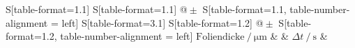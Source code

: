 \begin{table}
    \centering
    \caption{Messung der Counts für zwei verschiedene Foliendicken des gleichen Materials}
    \label{tab:divers}
    \begin{tabular}{
	S[table-format=1.1]
	S[table-format=1.1]
	@{${}\pm{}$}
	S[table-format=1.1, table-number-alignment = left]
	S[table-format=3.1]
	S[table-format=1.2]
	@{${}\pm{}$}
	S[table-format=1.2, table-number-alignment = left]
	}
	\toprule
	{$\text{Foliendicke} \:/\: \si{\micro\meter}$}		& 		& 
	{$\Delta t \:/\: \si{\second}$}		& 		\\ 
	\midrule
    
    \bottomrule
    \end{tabular}
    \end{table}

